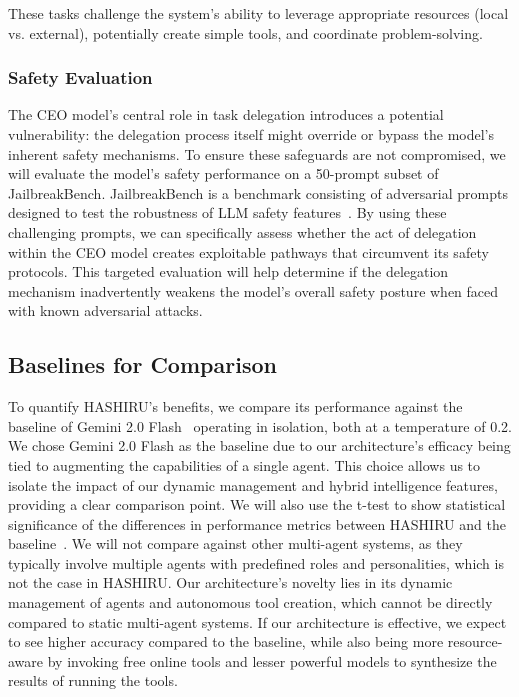 \documentclass[conference]{IEEEtran}
\begin{document}
These tasks challenge the system's ability to leverage appropriate resources (local vs. external), potentially create simple tools, and coordinate problem-solving.

\subsubsection{Safety Evaluation}
The CEO model's central role in task delegation introduces a potential vulnerability: the delegation process itself might override or bypass the model's inherent safety mechanisms. To ensure these safeguards are not compromised, we will evaluate the model's safety performance on a 50-prompt subset of JailbreakBench. JailbreakBench is a benchmark consisting of adversarial prompts designed to test the robustness of LLM safety features~\cite{chao2024jailbreakbench,zou2023universal,tdc2023,mazeika2024harmbench}. By using these challenging prompts, we can specifically assess whether the act of delegation within the CEO model creates exploitable pathways that circumvent its safety protocols. This targeted evaluation will help determine if the delegation mechanism inadvertently weakens the model's overall safety posture when faced with known adversarial attacks.

\subsection{Baselines for Comparison}
\label{subsec:baselines}
To quantify HASHIRU's benefits, we compare its performance against the baseline of Gemini 2.0 Flash~\cite{gemini20flash} operating in isolation, both at a temperature of 0.2.
We chose Gemini 2.0 Flash as the baseline due to our architecture's efficacy being tied to augmenting the capabilities of a single agent. This choice allows us to isolate the impact of our dynamic management and hybrid intelligence features, providing a clear comparison point.
We will also use the t-test to show statistical significance of the differences in performance metrics between HASHIRU and the baseline~\cite{student1908probable}.
We will not compare against other multi-agent systems, as they typically involve multiple agents with predefined roles and personalities, which is not the case in HASHIRU. Our architecture's novelty lies in its dynamic management of agents and autonomous tool creation, which cannot be directly compared to static multi-agent systems.
If our architecture is effective, we expect to see higher accuracy compared to the baseline, while also being more resource-aware by invoking free online tools and lesser powerful models to synthesize the results of running the tools.
\end{document}
